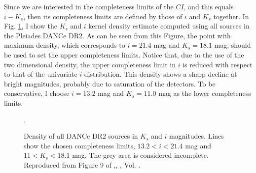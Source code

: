Since we are interested in the completeness limits of the $CI$, and this equals $i -K_s$, then its completeness limits are defined by those of $i$ and $K_s$ together. In Fig. \ref{fig:completeness}, I show the $K_s$ and $i$ kernel density estimate computed using all sources in the Pleiades DANCe DR2. As can be seen from this Figure, the point with maximum density, which corresponds to $i=21.4$ mag and $K_s=18.1$ mag, should be used to set the upper completeness limits. Notice that, due to the use of the two dimensional density, the upper completeness limit in $i$ is reduced with respect to that of the univariate $i$ distribution. This density shows a sharp decline at bright magnitudes, probably due to saturation of the detectors. To be conservative, I choose $i=13.2$ mag and $K_s=11.0$ mag as the lower completeness limits.

\begin{figure}[htbp]
\begin{center}
\caption{Density of all DANCe DR2 sources in $K_s$ and $i$ magnitudes. Lines show the chosen completeness limits, $13.2<i<21.4$ mag and $11<K_s<18.1$ mag. The grey area is considered incomplete. Reproduced from Figure 9 of \citet{Olivares2017},\textit{}, , Vol. .}
\label{fig:completeness}.
\end{center}
\end{figure}

